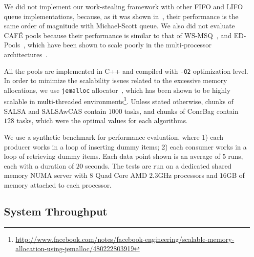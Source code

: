 We did not implement our work-stealing framework with other FIFO and LIFO queue implementations, because, as it was shown in~\cite{Sundell:2011:LAC:1989493.1989550}, their performance is the same order of magnitude with Michael-Scott queue. 
We also did not evaluate {CAF\'E} pools because their performance is similar to that of WS-MSQ~\cite{Basin:Thesis:2011}, and ED-Pools~\cite{Afek:2010:SPP:1885276.1885295}, which have been shown to scale poorly in the multi-processor architectures~\cite{Basin:Thesis:2011,Sundell:2011:LAC:1989493.1989550}. 

All the pools are implemented in C++ and compiled with \texttt{-O2} optimization level. 
In order to minimize the scalability issues related to the excessive memory allocations, we use \texttt{jemalloc} allocator~\cite{citeulike:4951109}, which has been shown to be highly scalable in multi-threaded environments\footnote{\url{http://www.facebook.com/notes/facebook-engineering/scalable-memory-allocation-using-jemalloc/480222803919}}.
Unless stated otherwise, chunks of SALSA and SALSAwCAS contain $1000$ tasks, and chunks of ConcBag contain $128$ tasks, which were the optimal values for each algorithms. 

We use a synthetic benchmark for performance evaluation, where 1) each producer works in a loop of inserting dummy items; 2) each consumer works in a loop of retrieving dummy items. Each data point shown is an average of $5$ runs, each with a duration of $20$ seconds. 
The tests are run on a dedicated shared memory NUMA server with $8$ Quad Core AMD $2.3$GHz processors and $16$GB of memory attached to each processor. 

\subsection{System Throughput}
\label{sec:eval-performance}

